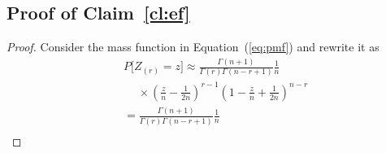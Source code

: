 \documentclass[12pt]{article}
\theoremstyle{plain}
\theoremstyle{remark}
\begin{document}
\begin{appendix}
\section{Proof of Claim~\ref{cl:ef}}\label{appx:ef}


\begin{proof}
Consider the mass function in Equation~(\ref{eq:pmf}) and rewrite it as
\begin{align*}
	&P\bigg[ Z_{(r)} = z \bigg] \approx \frac{\Gamma(n+1)}{\Gamma(r)\Gamma(n - r + 1)} \frac{1}{n}  \\
	&\hspace{15pt} \times  \left(\frac{z}{n} - \frac{1}{2n}\right)^{r-1} \left(1-\frac{z}{n} + \frac{1}{2n}\right)^{n-r}\\
	&= \frac{\Gamma(n+1)}{\Gamma(r)\Gamma(n - r + 1)} \frac{1}{n}  \\

\end{align*}
\end{proof}
\end{appendix}
\end{document}
